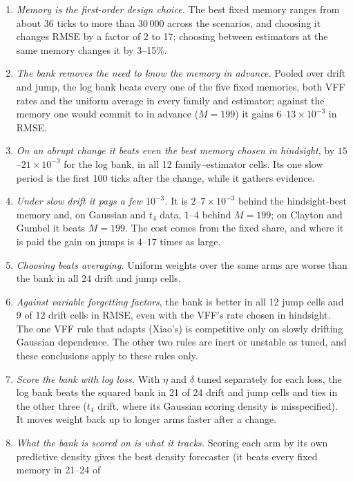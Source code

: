 \begin{enumerate}
  \item \emph{Memory is the first-order design choice.} The best fixed memory ranges from about 36
    ticks to more than 30\,000 across the scenarios, and choosing it changes RMSE by a factor of 2 to
    17; choosing between estimators at the same memory changes it by 3--15\%.
  \item \emph{The bank removes the need to know the memory in advance.} Pooled over drift and
    jump, the log bank beats every one of the five fixed memories, both VFF rates and the uniform
    average in every family and estimator; against the memory one would commit to in advance
    ($M=199$) it gains $6$--$13\times10^{-3}$ in RMSE.
  \item \emph{On an abrupt change it beats even the best memory chosen in hindsight}, by
    $15$--$21\times10^{-3}$ for the log bank, in all 12 family--estimator cells. Its one slow
    period is the first 100 ticks after the change, while it gathers evidence.
  \item \emph{Under slow drift it pays a few $10^{-3}$.} It is $2$--$7\times10^{-3}$ behind the
    hindsight-best memory and, on Gaussian and $t_4$ data, $1$--$4$ behind $M=199$; on Clayton and
    Gumbel it beats $M=199$. The cost comes from the fixed share, and where it is paid the gain on
    jumps is $4$--$17$ times as large.
  \item \emph{Choosing beats averaging.} Uniform weights over the same arms are worse than the bank
    in all 24 drift and jump cells.
  \item \emph{Against variable forgetting factors}, the bank is better in all 12 jump cells and 9 of
    12 drift cells in RMSE, even with the VFF's rate chosen in hindsight. The one VFF rule that
    adapts (Xiao's) is competitive only on slowly drifting Gaussian dependence. The other two
    rules are inert or unstable as tuned, and these conclusions apply to these rules only.
  \item \emph{Score the bank with log loss.} With $\eta$ and $\delta$ tuned separately for each
    loss, the log bank beats the squared bank in 21 of 24 drift and jump cells and ties in the other
    three ($t_4$ drift, where its Gaussian scoring density is misspecified). It moves weight back up
    to longer arms faster after a change.
  \item \emph{What the bank is scored on is what it tracks.} Scoring each arm by its own
    predictive density gives the best density forecaster (it beats every fixed memory in 21--24 of

\end{enumerate}

